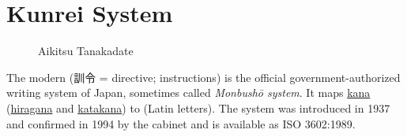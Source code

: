 \section{Kunrei System}
\label{sec:Kunrei}
\label{sec:KunreiSystem}
\label{sec:JapanSystemLatinLetters}


\begin{figure}
        \caption{Aikitsu Tanakadate}
        \label{fig:AikitsuTanakadate}
\end{figure}

The modern  (訓令 = directive; instructions) is the official government-authorized
writing system of Japan, sometimes called \textit{Monbushō system}. It maps
\hyperref[sec:Kana]{kana} (\hyperref[sec:Hiragana]{hiragana} and
\hyperref[sec:Katakana]{katakana}) to 
(Latin letters). The system was introduced in 1937 and confirmed in 1994 by the
cabinet and is available as ISO 3602:1989.


